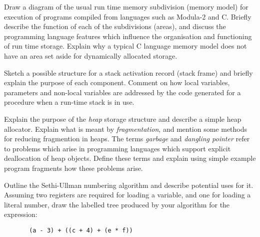 \begin{questions}
\question

\begin{subquestions}
\subquestion
Draw a diagram of the usual run time memory
subdivision (memory model) for execution of
programs compiled from languages such as
Modula-2 and C.  Briefly describe the function of each
of the subdivisions (areas), and discuss
the programming language features which influence
the organisation and functioning of run time storage.
Explain why a typical C language memory model does not
have an area set aside for dynamically allocated
storage. 

\subquestion
Sketch a possible structure for a stack activation
record (stack frame) and briefly explain the purpose of
each component. Comment on how local variables,
parameters and non-local variables
are addressed by the code generated for a
procedure when a run-time stack is in use.

\subquestion
Explain the purpose of the {\em heap} storage structure and
describe a simple heap allocator.  Explain what is 
meant by {\em fragmentation}, and mention some methods
for reducing fragmention in heaps.  The terms
{\em garbage\/} and {\em dangling pointer} refer to
problems which arise in programming languages which
support explicit deallocation of heap objects. Define
these terms and explain using simple example program
fragments how these problems arise.


\end{subquestions}


 
\question

\begin{subquestions}

\subquestion
Outline the Sethi-Ullman numbering algorithm and 
describe potential uses for it.  Assuming two registers
are required for loading a variable, and one for loading a literal number, 
draw the labelled
tree produced by your algorithm for the expression:
\begin{verbatim}
       (a - 3) + ((c + 4) + (e * f))
\end{verbatim}

\subquestion


\end{subquestions}
\end{questions}
